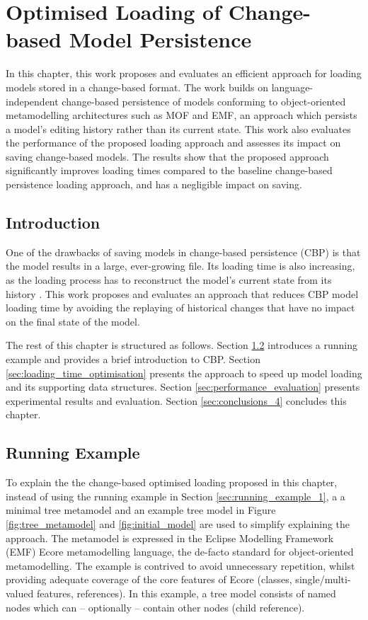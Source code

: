 \chapter{Optimised Loading of Change-based Model Persistence}
\label{ch:optimised_loading}

In this chapter, this work proposes and evaluates an efficient approach for loading models stored in a change-based format. The work builds on language-independent change-based persistence of models conforming to object-oriented metamodelling architectures such as MOF and EMF, an approach which persists a model's editing history rather than its current state. This work also evaluates the performance of the proposed loading approach and assesses its impact on saving change-based models. The results show that the proposed approach significantly improves loading times compared to the baseline change-based persistence loading approach, and has a negligible impact on saving.

\section{Introduction}
\label{sec:introduction_4}
One of the drawbacks of saving models in change-based persistence (CBP) is that the model results in a large, ever-growing file.  
Its loading time is also increasing, as the loading process has to reconstruct the model's current state from its history \cite{DBLP:conf/models/YohannisKP17}. This work proposes and evaluates an approach that reduces CBP model loading time by avoiding the replaying of historical changes that have no impact on the final state of the model.

The rest of this chapter is structured as follows. Section \ref{sec:case_study} introduces a running example and provides a brief introduction to CBP.
Section \ref{sec:loading_time_optimisation} presents the approach to speed up model loading and its supporting data structures. Section \ref{sec:performance_evaluation} presents experimental results and evaluation.  Section \ref{sec:conclusions_4} concludes this chapter.

\section{Running Example}
\label{sec:case_study}
To explain the the change-based optimised loading proposed in this chapter, instead of using the running example in Section \ref{sec:running_example_1}, a a minimal tree metamodel and an example tree model in Figure \ref{fig:tree_metamodel} and \ref{fig:initial_model} are used to simplify explaining the approach. 
The metamodel is expressed in the Eclipse Modelling Framework (EMF) Ecore metamodelling language, the de-facto standard for object-oriented metamodelling.  The example is contrived to avoid unnecessary repetition, whilst providing adequate coverage of the core features of Ecore (classes, single/multi-valued features, references).
In this example, a tree model consists of named nodes which can -- optionally -- contain other nodes (\textsf{child} reference).

